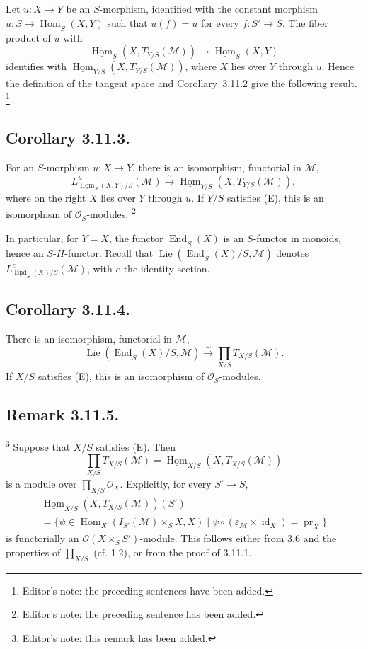 Let \(u:X\to Y\) be an \(S\)-morphism, identified with the constant
morphism \(u:S\to\underline{\operatorname{Hom}}_S(X,Y)\) such that
\(u(f)=u\) for every \(f:S'\to S\). The fiber product of \(u\) with
\[
  \underline{\operatorname{Hom}}_S(X,T_{Y/S}(\mathcal M))
  \longrightarrow\underline{\operatorname{Hom}}_S(X,Y)
\]
identifies with
\(\underline{\operatorname{Hom}}_{Y/S}(X,T_{Y/S}(\mathcal M))\), where
\(X\) lies over \(Y\) through \(u\). Hence the definition of the tangent
space and Corollary~3.11.2 give the following result.
\footnote{Editor's note: the preceding sentences have been added.}

\subsection*{Corollary 3.11.3.}
For an \(S\)-morphism \(u:X\to Y\), there is an isomorphism, functorial
in \(\mathcal M\),
\[
  L^u_{\underline{\operatorname{Hom}}_S(X,Y)/S}(\mathcal M)
  \xrightarrow{\sim}
  \underline{\operatorname{Hom}}_{Y/S}(X,T_{Y/S}(\mathcal M)),
\]
where on the right \(X\) lies over \(Y\) through \(u\). If \(Y/S\)
satisfies (E), this is an isomorphism of \(\mathcal O_S\)-modules.
\footnote{Editor's note: the preceding sentence has been added.}

In particular, for \(Y=X\), the functor
\(\underline{\operatorname{End}}_S(X)\) is an \(S\)-functor in monoids,
hence an \(S\)-\(H\)-functor. Recall that
\(\underline{\operatorname{Lie}}(\underline{\operatorname{End}}_S(X)/S,
\mathcal M)\) denotes
\(L^e_{\underline{\operatorname{End}}_S(X)/S}(\mathcal M)\), with \(e\)
the identity section.

\subsection*{Corollary 3.11.4.}
There is an isomorphism, functorial in \(\mathcal M\),
\[
  \underline{\operatorname{Lie}}
    (\underline{\operatorname{End}}_S(X)/S,\mathcal M)
  \xrightarrow{\sim}
  \prod_{X/S}T_{X/S}(\mathcal M).
\]
If \(X/S\) satisfies (E), this is an isomorphism of
\(\mathcal O_S\)-modules.
\footnotemark[38]

\subsection*{Remark 3.11.5.}
\footnote{Editor's note: this remark has been added.}
Suppose that \(X/S\) satisfies (E). Then
\[
  \prod_{X/S}T_{X/S}(\mathcal M)
  =\underline{\operatorname{Hom}}_{X/S}(X,T_{X/S}(\mathcal M))
\]
is a module over \(\prod_{X/S}\mathcal O_X\). Explicitly, for every
\(S'\to S\),
\begin{multline*}
  \underline{\operatorname{Hom}}_{X/S}
    (X,T_{X/S}(\mathcal M))(S')\\
  =\{\psi\in\operatorname{Hom}_X(I_{S'}(\mathcal M)\times_SX,X)
    \mid\psi\circ(\varepsilon_{\mathcal M}\times\operatorname{id}_X)
      =\operatorname{pr}_X\}
\end{multline*}
is functorially an \(\mathcal O(X\times_SS')\)-module. This follows either
from 3.6 and the properties of \(\prod_{X/S}\) (cf. 1.2), or from the
proof of 3.11.1.

